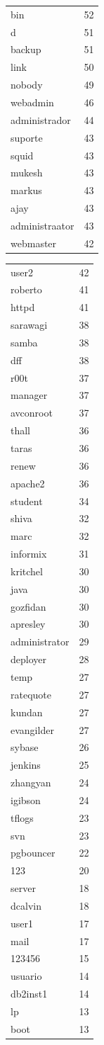 \documentclass[12pt, oneside]{book}
\begin{document}
\begin{longtable}{|l|r|}
bin&52\\ 
d&51\\ 
backup&51\\ 
link&50\\ 
nobody&49\\ 
webadmin&46\\ 
administrador&44\\ 
suporte&43\\ 
squid&43\\ 
mukesh&43\\ 
markus&43\\ 
ajay&43\\ 
administraator&43\\ 
webmaster&42\\ 
\end{longtable}
\newpage
\thispagestyle{empty}
\begin{longtable}{|l|r|}
user2&42\\ 
roberto&41\\ 
httpd&41\\ 
sarawagi&38\\ 
samba&38\\ 
dff&38\\ 
r00t&37\\ 
manager&37\\ 
avconroot&37\\ 
thall&36\\ 
taras&36\\ 
renew&36\\ 
apache2&36\\ 
student&34\\ 
shiva&32\\ 
marc&32\\ 
informix&31\\ 
kritchel&30\\ 
java&30\\ 
gozfidan&30\\ 
apresley&30\\ 
administrator&29\\ 
deployer&28\\ 
temp&27\\ 
ratequote&27\\ 
kundan&27\\ 
evangilder&27\\ 
sybase&26\\ 
jenkins&25\\ 
zhangyan&24\\ 
igibson&24\\ 
tflogs&23\\ 
svn&23\\ 
pgbouncer&22\\ 
123&20\\ 
server&18\\ 
dcalvin&18\\ 
user1&17\\ 
mail&17\\ 
123456&15\\ 
usuario&14\\ 
db2inst1&14\\ 
lp&13\\ 
boot&13\\
\hline
\end{longtable}
	 
\end{document}
